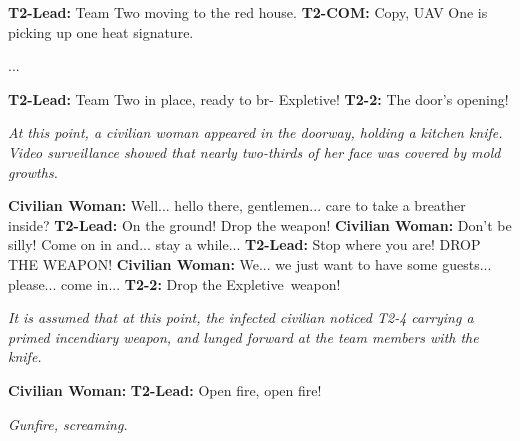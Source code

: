 \begin{leftbar}
\begin{flushleft}

\textbf{T2-Lead:} Team Two moving to the red house.\linebreak
\textbf{T2-COM:} Copy, UAV One is picking up one heat signature.

...

\textbf{T2-Lead:} Team Two in place, ready to br- \lb Expletive\rb!\linebreak
\textbf{T2-2:} The door's opening!\linebreak

\textsl{At this point, a civilian woman appeared in the doorway, holding a kitchen knife. Video surveillance showed that nearly two-thirds of her face was covered by mold growths.}\linebreak

\textbf{Civilian Woman:} Well... hello there, gentlemen... care to take a breather inside?\linebreak
\textbf{T2-Lead:} On the ground! Drop the weapon!\linebreak
\textbf{Civilian Woman:} Don't be silly! Come on in and... stay a while...\linebreak
\textbf{T2-Lead:} Stop where you are! DROP THE WEAPON!\linebreak
\textbf{Civilian Woman:} We... we just want to have some guests... please... come in...\linebreak
\textbf{T2-2:} Drop the \lb Expletive\rb \ weapon!\linebreak

\textsl{It is assumed that at this point, the infected civilian noticed T2-4 carrying a primed incendiary weapon, and lunged forward at the team members with the knife.}\linebreak

\textbf{Civilian Woman:} \expunged \linebreak
\textbf{T2-Lead:} Open fire, open fire!\linebreak

\textsl{Gunfire, screaming.}
\end{flushleft}
\end{leftbar}